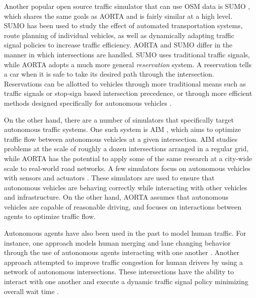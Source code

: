 \documentclass[letterpaper, 10 pt, conference]{ieeeconf}  %
\begin{document}
Another popular open source traffic simulator that can use OSM data is SUMO
\cite{SUMO2011}, which shares the same goals as AORTA and is fairly similar at
a high level. SUMO has been used to study the effect of automated
transportation systems, route planning of individual vehicles, as well as
dynamically adapting traffic signal policies to increase traffic efficiency.
AORTA and SUMO differ in the manner in which intersections are handled. SUMO
uses traditional traffic signals, while AORTA adopts a much more general
\textit{reservation} system. A reservation tells a car when it is safe to take
its desired path through the intersection. Reservations can be allotted to
vehicles through more traditional means such as traffic signals or stop-sign
based intersection precedence, or through more efficient methods designed
specifically for autonomous vehicles \cite{JAIR08-dresner}.

On the other hand, there are a number of simulators that specifically
target autonomous traffic systems. One such system is AIM
\cite{JAIR08-dresner}, which aims to optimize traffic flow between
autonomous vehicles at a given intersection. AIM studies problems at
the scale of roughly a dozen intersections arranged in a regular grid,
while AORTA has the potential to apply some of the same research at a
city-wide scale to real-world road networks. A few simulators focus on
autonomous vehicles with sensors and actuators
\cite{figueiredo2009approach}. These simulators are used to ensure
that autonomous vehicles are behaving correctly while interacting with
other vehicles and infrastructure. On the other hand, AORTA assumes
that autonomous vehicles are capable of reasonable driving, and
focuses on interactions between agents to optimize traffic flow.

Autonomous agents have also been used in the past to model human
traffic. For instance, one approach models human merging and lane
changing behavior through the use of autonomous agents interacting
with one another \cite{hidas2002modelling}. Another approach attempted
to improve traffic congestion for human drivers by using a network of
autonomous intersections.  These intersections have the ability to
interact with one another and execute a dynamic traffic signal policy
minimizing overall wait time \cite{manikonda2001autonomous}.

\end{document}
